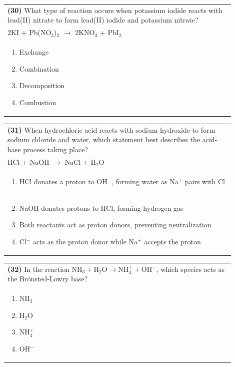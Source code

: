 \documentclass{article}
\begin{document}
\noindent\begin{tabular}{|p{0.9\linewidth}|}
\hline
\textbf{(30)} What type of reaction occurs when potassium iodide reacts with lead(II) nitrate to form lead(II) iodide and potassium nitrate?\\[0.2cm]
2KI + Pb(NO$_3$)$_2$ $\rightarrow$ 2KNO$_3$ + PbI$_2$\\[0.2cm]
\begin{minipage}[t]{0.85\linewidth}
\begin{enumerate}[label=\alph*.]
\item Exchange
\item Combination
\item Decomposition
\item Combustion
\end{enumerate}
\end{minipage}\\[0.2cm]
\hline
\end{tabular}

\noindent\begin{tabular}{|p{0.9\linewidth}|}
\hline
\textbf{(31)} When hydrochloric acid reacts with sodium hydroxide to form sodium chloride and water, which statement best describes the acid-base process taking place?\\[0.2cm]
HCl + NaOH $\rightarrow$ NaCl + H$_2$O\\[0.2cm]
\begin{minipage}[t]{0.85\linewidth}
\begin{enumerate}[label=\alph*.]
\item HCl donates a proton to OH$^-$, forming water as Na$^+$ pairs with Cl$^-$
\item NaOH donates protons to HCl, forming hydrogen gas
\item Both reactants act as proton donors, preventing neutralization
\item Cl$^-$ acts as the proton donor while Na$^+$ accepts the proton
\end{enumerate}
\end{minipage}\\[0.2cm]
\hline
\end{tabular}

\noindent\begin{tabular}{|p{0.9\linewidth}|}
\hline
\textbf{(32)} In the reaction $\text{NH}_3 + \text{H}_2\text{O} \rightarrow \text{NH}_4^+ + \text{OH}^-$, which species acts as the Brönsted-Lowry base?\\[0.2cm]
\begin{minipage}[t]{0.85\linewidth}
\begin{enumerate}[label=\alph*.]
\item NH$_3$
\item H$_2$O
\item NH$_4^+$
\item OH$^-$
\end{enumerate}
\end{minipage}\\[0.2cm]
\hline
\end{tabular}
\newpage
\end{document}
